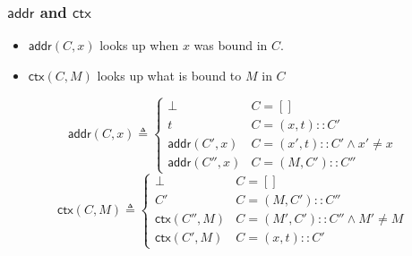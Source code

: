 \documentclass{beamer}
\newcommand*{\cons}{::}
\newcommand*{\addr}{\mathsf{addr}}
\newcommand*{\modctx}{\mathsf{ctx}}
\begin{document}
\begin{frame}[c]
  \frametitle{$\addr$ and $\modctx$}
  \begin{itemize}
    \item $\addr(C,x)$ looks up when $x$ was bound in $C$.
    \item $\modctx(C,M)$ looks up what is bound to $M$ in $C$
  \end{itemize}
  \begin{figure}[h!]
    \centering
    \footnotesize
    \[
      \addr(C,x)\triangleq
      \begin{cases}
        \bot         & C=[]                              \\
        t            & C=(x, t)\cons C'                  \\
        \addr(C',x)  & C=(x', t)\cons C' \wedge x'\neq x \\
        \addr(C'',x) & C=(M, C')\cons C''
      \end{cases}
    \]
    \[
      \modctx(C,M)\triangleq
      \begin{cases}
        \bot           & C=[]                               \\
        C'             & C=(M, C')\cons C''                 \\
        \modctx(C'',M) & C=(M', C')\cons C''\wedge M'\neq M \\
        \modctx(C',M)  & C=(x, t)\cons C'
      \end{cases}
    \]
  \end{figure}
\end{frame}
\end{document}
